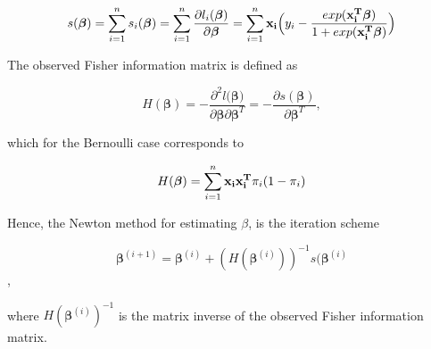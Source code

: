 \begin{equation}
\label{eq:score}
s(\bm{\beta}) = \sum_{i=1}^{n}s_i(\bm{\beta}) = \sum_{i=1}^{n} \frac{\partial l_i(\bm{\beta})}{\partial \bm{\beta}} = \sum_{i=1}^{n} {\bf x_i} \Big ( y_i - \frac{exp({\bf x_i^T} \bm{ \beta})}{1 + exp({\bf x_i^T} \bm{ \beta})}\Big )
\end{equation}

The observed Fisher information matrix is defined as 

\begin{equation}
    H(\bm {\beta}) = - \frac{\partial^2 l(\bm {\beta)}}{\partial \bm{\beta} \partial \bm{\beta}^T} = -\frac{\partial s(\bm{\beta})}{\partial \bm{\beta}^T},
\end{equation}

which for the Bernoulli case corresponds to

\begin{equation}
    H(\bm{\beta}) = \sum_{i=1}^{n} {\bf x_i x_i^T} \pi_i (1-\pi_i)
\end{equation}

Hence, the Newton method for estimating $\beta$, is the iteration scheme

\begin{equation}
\label{eq:Newton}
    \bm{\beta}^{(i+1)} = \bm{\beta}^{(i)} + (H(\bm{\beta}^{(i)}))^{-1} s(\bm{\beta}^{(i)}
\end{equation},

where $H(\bm{\beta}^{(i)})^{-1}$ is the matrix inverse of the observed Fisher information matrix.














